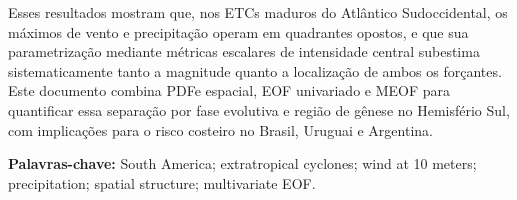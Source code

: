 Esses resultados mostram que, nos ETCs maduros do Atlântico Sudoccidental, os máximos de vento e precipitação operam em quadrantes opostos, e que sua parametrização mediante métricas escalares de intensidade central subestima sistematicamente tanto a magnitude quanto a localização de ambos os forçantes.
Este documento combina PDFe espacial, EOF univariado e MEOF para quantificar essa separação por fase evolutiva e região de gênese no Hemisfério Sul, com implicações para o risco costeiro no Brasil, Uruguai e Argentina.

\vspace{1cm}

\noindent \textbf{Palavras-chave:} South America; extratropical cyclones; wind at 10 meters; precipitation; spatial structure; multivariate EOF.
